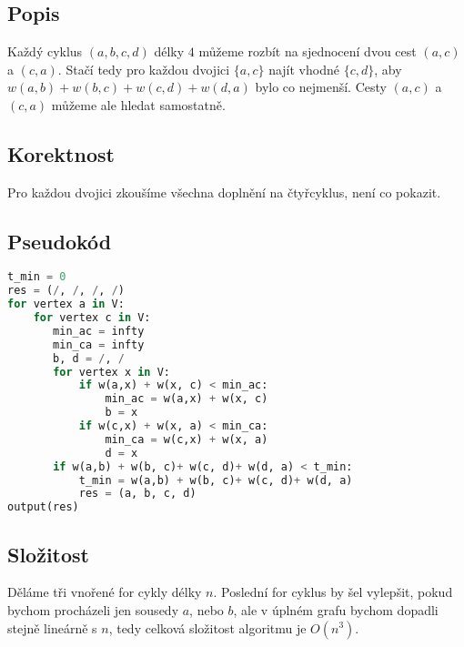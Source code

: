 \documentclass[a4paper]{article}
\begin{document}
\section{}
\subsection{Popis}
Každý cyklus $(a,b,c,d)$ délky $4$ můžeme rozbít na sjednocení dvou cest $(a, c)$ a $(c, a)$. Stačí tedy pro každou dvojici $\{a,c\}$ najít vhodné $\{c ,d\}$, aby $w(a,b)+w(b,c)+w(c,d)+w(d,a)$ bylo co nejmenší. Cesty $(a, c)$ a $(c, a)$ můžeme ale hledat samostatně.
\subsection{Korektnost}
Pro každou dvojici zkoušíme všechna doplnění na čtyřcyklus, není co pokazit.
\subsection{Pseudokód}
\begin{lstlisting}[language=Python]
t_min = 0
res = (/, /, /, /)
for vertex a in V:
    for vertex c in V:
       min_ac = infty
       min_ca = infty
       b, d = /, /
       for vertex x in V:
           if w(a,x) + w(x, c) < min_ac:
               min_ac = w(a,x) + w(x, c)
               b = x
           if w(c,x) + w(x, a) < min_ca:
               min_ca = w(c,x) + w(x, a)
               d = x
       if w(a,b) + w(b, c)+ w(c, d)+ w(d, a) < t_min:
           t_min = w(a,b) + w(b, c)+ w(c, d)+ w(d, a)
           res = (a, b, c, d)
output(res)   
\end{lstlisting}
\subsection{Složitost}
Děláme tři vnořené for cykly délky $n$. Poslední for cyklus by šel vylepšit, pokud bychom procházeli jen sousedy $a$, nebo $b$, ale v úplném grafu bychom dopadli stejně lineárně s $n$, tedy celková složitost algoritmu je $O(n^3)$.
\end{document}
